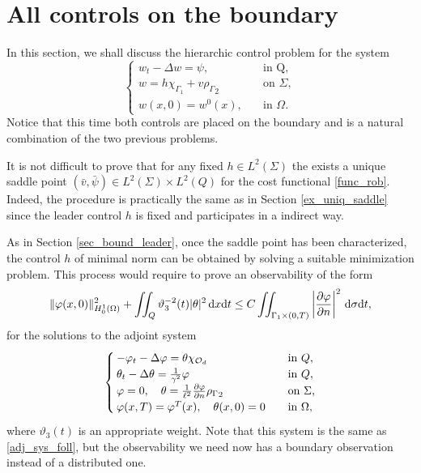 \documentclass[preprint,10pt]{article}
\numberwithin{equation}{section}
\numberwithin{theorem}{section}
\def\dx{\,\textnormal{d}x}
\def\dt{\textnormal{d}t}
\def\d{\,\textnormal{d}}
\def\cbd{\Gamma}
\def\csbd{\rho_{\Gamma}}
\def\dx{\,\textnormal{d}x}
\def\dt{\textnormal{d}t}
\def\d{\,\textnormal{d}}
\begin{document}
{\section{All controls on the boundary}\label{sec_bound}

In this section, we shall discuss the hierarchic control problem for the system
%
\begin{equation}\label{sys_sec3}
\begin{cases}
w_t-\Delta w=\psi, & \quad \text{in Q}, \\
w=h\chi_{\cbd_1}+ v{\csbd}_2&\quad \text{on } \Sigma, \\
w(x,0)=w^0(x), &\quad \text{in } \Omega.
\end{cases}
\end{equation}
%
Notice that this time both controls are placed on the boundary and is a natural combination of the two previous problems. %

It is not difficult to prove that for any fixed $h\in L^2(\Sigma)$ the exists a unique saddle point $(\bar v,\bar \psi)\in L^2(\Sigma)\times L^2(Q)$ for the cost functional \eqref{func_rob}. Indeed, the procedure is practically the same as in Section \ref{ex_uniq_saddle} since the leader control $h$ is fixed and participates in a indirect way. 

As in Section \ref{sec_bound_leader}, once the saddle point has been characterized, the control $h$ of minimal norm can be obtained by solving a suitable minimization problem. This process would require to prove an observability of the form
%
\begin{equation}\label{obs_ineq_sec3}
\|\varphi(x,0)\|^2_{H_0^1(\Omega)}+\iint_{Q}\vartheta_3^{-2}(t)|\theta|^2\dx\dt\leq C\iint_{ \cbd_1\times(0,T)}\left|\frac{\partial\varphi}{\partial n}\right|^2\d\sigma\dt,
\end{equation}
%
 for the solutions to the adjoint system 
%
\begin{equation}\label{adj_sys_3}
\begin{cases}
-\varphi_t-\Delta \varphi= \theta\chi_{\mathcal O_d} \quad&\textnormal{in }Q, \\
\theta_t-\Delta \theta=\frac{1}{\gamma^2}\varphi \quad& \textnormal{in }Q, \\
\varphi=0, \quad \theta=\frac{1}{\ell^2}\frac{\partial \varphi}{\partial n}{\csbd}_2 \quad &\textnormal{on $\Sigma$,} \\
\varphi(x,T)=\varphi^T(x), \quad \theta(x,0)=0 \quad &\textnormal{in $\Omega$},
\end{cases}
\end{equation}
%
where $\vartheta_3(t)$ is an appropriate weight. Note that this system is the same as \eqref{adj_sys_foll}, but the observability we need now has a boundary observation instead of a distributed one. 

}
\end{document}
